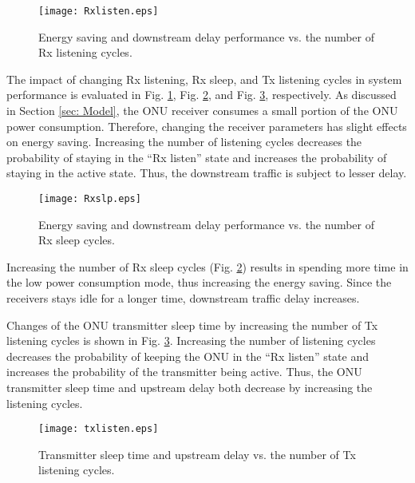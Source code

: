 \documentclass[11pt,english,12pt,onecolumn, draftcls]{IEEEtran}
\theoremstyle{plain}
\theoremstyle{definition}
\begin{document}
\begin{figure}
\centering
\texttt{[image: Rxlisten.eps]}
\caption{Energy saving and downstream delay performance vs. the number of Rx listening cycles.}
\label{fig:rxl}
\vspace{-.2in}
\end{figure}

The impact of changing Rx listening, Rx sleep, and Tx listening cycles in system performance is evaluated in Fig. \ref{fig:rxl}, Fig. \ref{fig:rxs}, and Fig. \ref{fig:txl}, respectively. As  discussed in Section \ref{sec: Model}, the ONU receiver consumes a small portion of the ONU power consumption. Therefore, changing the receiver parameters has slight effects on energy saving.  Increasing the number of listening cycles decreases the probability of staying in the ``Rx listen'' state and increases the probability of staying in the active state. Thus, the downstream traffic is  subject to lesser delay.

\begin{figure}
\centering
\texttt{[image: Rxslp.eps]}
\caption{Energy saving and downstream delay performance vs. the number of Rx sleep cycles.}
\label{fig:rxs}
\vspace{-.15in}
\end{figure}


Increasing the number of Rx sleep cycles (Fig. \ref{fig:rxs}) results in spending more time in the low power consumption mode, thus increasing the energy saving. Since the receivers stays idle for a longer time, downstream traffic delay increases.

Changes of the ONU transmitter sleep time by increasing the number of Tx listening cycles is shown in Fig. \ref{fig:txl}. Increasing the number of listening cycles decreases the probability of keeping the ONU in the ``Rx listen'' state and increases the probability of the transmitter being active. Thus, the ONU transmitter sleep time and upstream delay both decrease by increasing the listening cycles.


\begin{figure}
\centering
\texttt{[image: txlisten.eps]}
\caption{Transmitter sleep time and upstream delay vs. the number of Tx listening cycles.}
\label{fig:txl}
\vspace{-.1in}
\end{figure}
\end{document}
